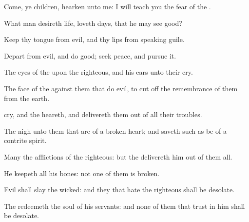 {\Q {}Come, ye
children,
hearken unto me: I will
teach you the
fear of the
{}.


\par }{\Q {}What
man
{}
desireth
life,
{}
loveth
{}
days, that he may
see
good?


\par }{\Q {}Keep thy
tongue from
evil, and thy
lips from
speaking
guile.


\par }{\Q {}Depart from
evil, and
do
good;
seek
peace, and
pursue it.


\par }{\Q {}The
eyes of the
{}
{} upon the
righteous, and his
ears
{} unto their
cry.


\par }{\Q {}The
face of the
{}
{} against them that
do
evil, to cut
off the
remembrance of them from the
earth.


\par }{\Q {}
cry, and the
{}
heareth, and
delivereth them out of all their
troubles.


\par }{\Q {}The
{}
{}
nigh unto them that are of a
broken
heart; and
saveth such as be of a
contrite
spirit.


\par }{\Q {}Many
{} the
afflictions of the
righteous: but the
{}
delivereth him out of them all.


\par }{\Q {}He
keepeth all his
bones: not
one of
them is
broken.


\par }{\Q {}Evil shall
slay the
wicked: and they that
hate the
righteous shall be
desolate.


\par }{\Q {}The
{}
redeemeth the
soul of his
servants: and none of them that
trust in him shall be
desolate.




\par }
